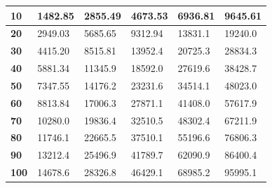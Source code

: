 \begin{table}[H]
\begin{tabular}{|l|l|l|l|l|l|}
\textbf{10}                                                                         & 1482.85         & 2855.49          & 4673.53          & 6936.81          & 9645.61          \\ \hline
\textbf{20}                                                                         & 2949.03         & 5685.65          & 9312.94          & 13831.1          & 19240.0          \\ \hline
\textbf{30}                                                                         & 4415.20         & 8515.81          & 13952.4          & 20725.3          & 28834.3          \\ \hline
\textbf{40}                                                                         & 5881.34         & 11345.9          & 18592.0          & 27619.6          & 38428.7          \\ \hline
\textbf{50}                                                                         & 7347.55         & 14176.2          & 23231.6          & 34514.1          & 48023.0          \\ \hline
\textbf{60}                                                                         & 8813.84         & 17006.3          & 27871.1          & 41408.0          & 57617.9          \\ \hline
\textbf{70}                                                                         & 10280.0         & 19836.4          & 32510.5          & 48302.4          & 67211.9          \\ \hline
\textbf{80}                                                                         & 11746.1         & 22665.5          & 37510.1          & 55196.6          & 76806.3          \\ \hline
\textbf{90}                                                                         & 13212.4         & 25496.9          & 41789.7          & 62090.9          & 86400.4          \\ \hline
\textbf{100}                                                                        & 14678.6         & 28326.8          & 46429.1          & 68985.2          & 95995.1          \\ \hline
\end{tabular}
\end{table}


